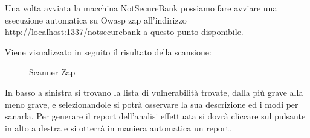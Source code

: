 Una volta avviata la macchina NotSecureBank possiamo fare avviare una esecuzione automatica su Owasp zap all'indirizzo http://localhost:1337/notsecurebank a questo punto disponibile.

Viene visualizzato in seguito il risultato della scansione: 
\begin{figure}[H]
    \caption{Scanner Zap}
    \label{fig:scanzap}
\end{figure}
In basso a sinistra si trovano la lista di vulnerabilità trovate, dalla più grave alla meno grave, e selezionandole si potrà osservare la sua descrizione ed i modi per sanarla.
Per generare il report dell’analisi effettuata si dovrà cliccare sul pulsante in alto a destra e si otterrà in maniera automatica un report. 

